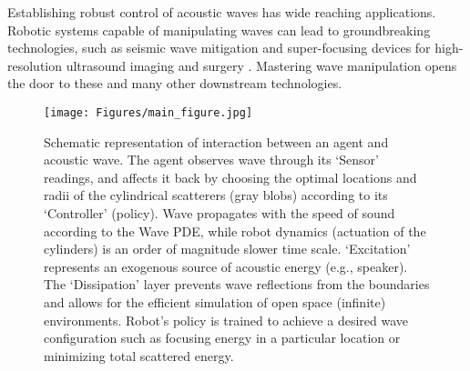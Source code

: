 Establishing robust control of acoustic waves has wide reaching applications. Robotic systems capable of manipulating waves can lead to groundbreaking technologies, such as 
seismic wave mitigation \cite{chen_2023_artificially,kim_2021_longitudinal} and super-focusing devices for high-resolution ultrasound imaging and surgery \cite{ilovitsh_2018_acoustical,ozcelik_2018_acoustic}. Mastering wave manipulation opens the door to these and many other downstream technologies. 
\begin{figure}[t!]
    \centering
    \texttt{[image: Figures/main\_figure.jpg]}
          \caption{Schematic representation of interaction between an agent and acoustic wave. The agent observes wave through its `Sensor' readings, and affects it back by choosing the optimal locations and radii of the cylindrical scatterers (gray blobs) according to its `Controller' (policy). Wave propagates with the speed of sound according to the Wave PDE, while robot dynamics (actuation of the cylinders) is an order of magnitude slower time scale. `Excitation' represents an exogenous source of acoustic energy (e.g., speaker). The `Dissipation' layer prevents wave reflections from the boundaries and allows for the efficient simulation of open space (infinite) environments. Robot's policy is trained to achieve a desired wave configuration such as focusing energy in a particular location or minimizing total scattered energy.}
    \label{fig:main_scheme}
\end{figure}


